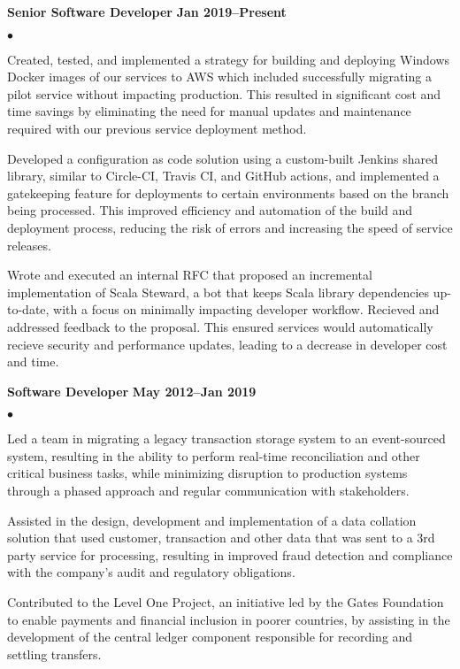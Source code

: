 \documentclass[10pt,letterpaper]{article}
\renewenvironment{itemize}{
  \begin{list}{}{
      \setlength{\leftmargin}{1.5em}
      \setlength{\itemsep}{0.25em}
      \setlength{\parskip}{0pt}
      \setlength{\parsep}{0.25em}
    }
  }{
  \end{list}
}
\newenvironment{bitemize}{
  \begin{list}{\(\bullet \)}{
      \setlength{\leftmargin}{1.5em}
      \setlength{\itemsep}{0.25em}
      \setlength{\parskip}{0pt}
      \setlength{\parsep}{0.25em}
    }
  }{
  \end{list}
}
\newcommand{\yearrange}[1]{\hfill \textbf{#1} \par}
\begin{document}
\begin{itemize}
  \item \textbf{Senior Software Developer} \yearrange{Jan 2019--Present}
  \begin{bitemize}
    \item Created, tested, and implemented a strategy for building and deploying
      Windows Docker images of our services to AWS which included successfully
      migrating a pilot service without impacting production. This resulted in
      significant cost and time savings by eliminating the need for manual
      updates and maintenance required with our previous service deployment
      method.
    \item Developed a configuration as code solution using a custom-built
      Jenkins shared library, similar to Circle-CI, Travis CI, and GitHub
      actions, and implemented a gatekeeping feature for deployments to certain
      environments based on the branch being processed. This improved efficiency
      and automation of the build and deployment process, reducing the risk of
      errors and increasing the speed of service releases.
    \item Wrote and executed an internal RFC that proposed an incremental
      implementation of Scala Steward, a bot that keeps Scala library
      dependencies up-to-date, with a focus on minimally impacting developer
      workflow. Recieved and addressed feedback to the proposal. This ensured
      services would automatically recieve security and performance updates,
      leading to a decrease in developer cost and time.
  \end{bitemize}
\end{itemize}

\begin{itemize}
  \item \textbf{Software Developer} \yearrange{May 2012--Jan 2019}
  \begin{bitemize}
    \item Led a team in migrating a legacy transaction storage system to an
      event-sourced system, resulting in the ability to perform real-time
      reconciliation and other critical business tasks, while minimizing
      disruption to production systems through a phased approach and regular
      communication with stakeholders.
    \item Assisted in the design, development and implementation of a data
      collation solution that used customer, transaction and other data that was
      sent to a 3rd party service for processing, resulting in improved fraud
      detection and compliance with the company's audit and regulatory
      obligations.
    \item Contributed to the Level One Project, an initiative led by the Gates
      Foundation to enable payments and financial inclusion in poorer countries,
      by assisting in the development of the central ledger component
      responsible for recording and settling transfers.
  \end{bitemize}
\end{itemize}
\end{document}
